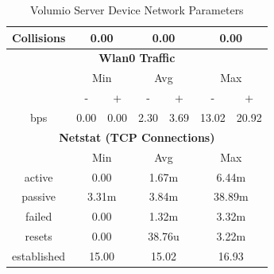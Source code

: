 \documentclass[11pt,a4paper,headinclude=false,footinclude=false]{scrreprt}
\begin{document}
\begin{table}[H]
\begin{tabular}{||c|c|c|c|c|c|c||}
    \hline
    Collisions & \multicolumn{2}{|c|}{0.00} & \multicolumn{2}{|c|}{0.00} & \multicolumn{2}{|c|}{0.00} \\
    \hline\hline
    \multicolumn{7}{|c|}{\textbf{Wlan0 Traffic}} \\
    \hline\hline
      & \multicolumn{2}{|c|}{Min} & \multicolumn{2}{|c|}{Avg} & \multicolumn{2}{|c|}{Max} \\
    \hline
      & - & + & - & + & - & + \\
    \hline
    bps  & 0.00 & 0.00 & 2.30 & 3.69 & 13.02 & 20.92 \\
    \hline\hline
    \multicolumn{7}{|c|}{\textbf{Netstat (TCP Connections)}} \\
    \hline\hline
      & \multicolumn{2}{|c|}{Min} & \multicolumn{2}{|c|}{Avg} & \multicolumn{2}{|c|}{Max} \\
    \hline
    active & \multicolumn{2}{|c|}{0.00} & \multicolumn{2}{|c|}{1.67m} & \multicolumn{2}{|c|}{6.44m} \\
    \hline
    passive & \multicolumn{2}{|c|}{3.31m} & \multicolumn{2}{|c|}{3.84m} & \multicolumn{2}{|c|}{38.89m} \\
    \hline
    failed & \multicolumn{2}{|c|}{0.00} & \multicolumn{2}{|c|}{1.32m} & \multicolumn{2}{|c|}{3.32m} \\
    \hline
    resets & \multicolumn{2}{|c|}{0.00} & \multicolumn{2}{|c|}{38.76u} & \multicolumn{2}{|c|}{3.22m} \\
    \hline
    established & \multicolumn{2}{|c|}{15.00} & \multicolumn{2}{|c|}{15.02} & \multicolumn{2}{|c|}{16.93} \\
    \hline\hline
    \end{tabular}
    \caption{Volumio Server Device Network Parameters}
    \label{VolumioserverNetTab}
\end{table}
\end{document}
